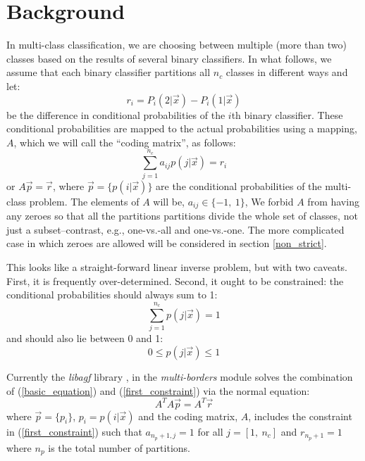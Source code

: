 \documentclass{article}
\begin{document}
\section{Background}

In multi-class classification, we are choosing between multiple (more than two)
classes based on the results of several binary classifiers.
In what follows, we assume that each binary classifier partitions all $n_c$
classes in different ways and let:
\begin{equation}
r_i=P_i(2|\vec x)-P_i(1|\vec x)
\label{rdef}
\end{equation}
be the difference in conditional probabilities of the $i$th binary classifier.
These conditional probabilities are mapped to the actual probabilities
using a mapping, $A$, which we will call the ``coding matrix'', as follows:
\begin{equation}
\sum_{j=1}^{n_c}a_{ij} p(j|\vec x)=r_i
\label{basic_equation}
\end{equation}
or $A \vec p=\vec r$, where $\vec p=\lbrace p(i|\vec x) \rbrace$ are the conditional probabilities
of the multi-class problem.
The elements of $A$ will be, $a_{ij} \in \lbrace -1, ~1 \rbrace$,
We forbid $A$ from having any zeroes so that all the partitions
partitions divide the whole set of classes, not just a subset--contrast, e.g.,
one-vs.-all and one-vs.-one.
The more complicated case in which zeroes are
allowed will be considered in section \ref{non_strict}.

This looks like a straight-forward linear inverse problem, but with two
caveats.  First, it is frequently over-determined.  Second, it ought to
be constrained: the conditional probabilities 
should always sum to 1:
\begin{equation}
\sum_{j=1}^{n_c} p(j|\vec x) = 1
\label{first_constraint}
\end{equation}
and should also lie between 0 and 1:
\begin{equation}
0 \le p(j|\vec x) \le 1
\end{equation}

Currently the {\it libagf} library \citep{Mills2011},
in the {\it multi-borders} module \citep{Mills2014} solves the 
combination of (\ref{basic_equation}) and (\ref{first_constraint}) via the
normal equation:
\begin{equation}
A^T A \vec p = A^T \vec r
\label{normal_eq}
\end{equation}
where $\vec p=\lbrace p_i \rbrace$, $p_i=p(i|\vec x)$ and the coding matrix,
$A$, includes the constraint in (\ref{first_constraint}) such that 
$a_{n_p+1, j}=1$ for all $j=[1,~n_c]$ and $r_{n_p+1}=1$ where $n_p$ is the total
number of partitions.
\end{document}
